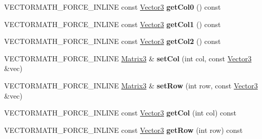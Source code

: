 \begin{DoxyCompactItemize}
V\+E\+C\+T\+O\+R\+M\+A\+T\+H\+\_\+\+F\+O\+R\+C\+E\+\_\+\+I\+N\+L\+I\+NE const \hyperlink{classVectormath_1_1Aos_1_1Vector3}{Vector3} {\bfseries get\+Col0} () const
\item 
\mbox{\label{classVectormath_1_1Aos_1_1Matrix3_a9dab7348aafbf7b84a7a65da583a89ef}} 
V\+E\+C\+T\+O\+R\+M\+A\+T\+H\+\_\+\+F\+O\+R\+C\+E\+\_\+\+I\+N\+L\+I\+NE const \hyperlink{classVectormath_1_1Aos_1_1Vector3}{Vector3} {\bfseries get\+Col1} () const
\item 
\mbox{\label{classVectormath_1_1Aos_1_1Matrix3_ab16e1463ed9b8f0ced262f5fef17321c}} 
V\+E\+C\+T\+O\+R\+M\+A\+T\+H\+\_\+\+F\+O\+R\+C\+E\+\_\+\+I\+N\+L\+I\+NE const \hyperlink{classVectormath_1_1Aos_1_1Vector3}{Vector3} {\bfseries get\+Col2} () const
\item 
\mbox{\label{classVectormath_1_1Aos_1_1Matrix3_af4ffa007f94bfbe10d7e0256eba7b25d}} 
V\+E\+C\+T\+O\+R\+M\+A\+T\+H\+\_\+\+F\+O\+R\+C\+E\+\_\+\+I\+N\+L\+I\+NE \hyperlink{classVectormath_1_1Aos_1_1Matrix3}{Matrix3} \& {\bfseries set\+Col} (int col, const \hyperlink{classVectormath_1_1Aos_1_1Vector3}{Vector3} \&vec)
\item 
\mbox{\label{classVectormath_1_1Aos_1_1Matrix3_a99430a86fcb7a83ae5bf226d90921d17}} 
V\+E\+C\+T\+O\+R\+M\+A\+T\+H\+\_\+\+F\+O\+R\+C\+E\+\_\+\+I\+N\+L\+I\+NE \hyperlink{classVectormath_1_1Aos_1_1Matrix3}{Matrix3} \& {\bfseries set\+Row} (int row, const \hyperlink{classVectormath_1_1Aos_1_1Vector3}{Vector3} \&vec)
\item 
\mbox{\label{classVectormath_1_1Aos_1_1Matrix3_a9f2ec00bd0b761beb9a3057fc5d787f2}} 
V\+E\+C\+T\+O\+R\+M\+A\+T\+H\+\_\+\+F\+O\+R\+C\+E\+\_\+\+I\+N\+L\+I\+NE const \hyperlink{classVectormath_1_1Aos_1_1Vector3}{Vector3} {\bfseries get\+Col} (int col) const
\item 
\mbox{\label{classVectormath_1_1Aos_1_1Matrix3_a5d9491d1f62da50fcdb590868323dbc7}} 
V\+E\+C\+T\+O\+R\+M\+A\+T\+H\+\_\+\+F\+O\+R\+C\+E\+\_\+\+I\+N\+L\+I\+NE const \hyperlink{classVectormath_1_1Aos_1_1Vector3}{Vector3} {\bfseries get\+Row} (int row) const
\item 

\end{DoxyCompactItemize}
